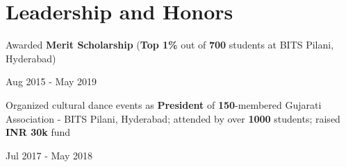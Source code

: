 \documentclass[]{Keval-resume}
\begin{document}
\sectionsep

\section{Leadership and Honors} 
\hrulefill
\postsectionsep 

\begin{minipage}[t]{.78\textwidth}
	\textbullet{} Awarded \textbf{Merit Scholarship} (\textbf{Top 1\%} out of \textbf{700} students at BITS Pilani, Hyderabad)
\end{minipage}%
\begin{minipage}[t]{.22\textwidth}
	\hfill Aug 2015 - May 2019
\end{minipage}

\begin{minipage}[t]{.78\textwidth}
	\textbullet{} Organized cultural dance events as \textbf{President} of \textbf{150}-membered Gujarati Association - BITS Pilani, Hyderabad; attended by over \textbf{1000} students; raised \textbf{INR 30k} fund
\end{minipage}%
\begin{minipage}[t]{.22\textwidth}
	\hfill Jul 2017 - May 2018
\end{minipage}


\end{document}
